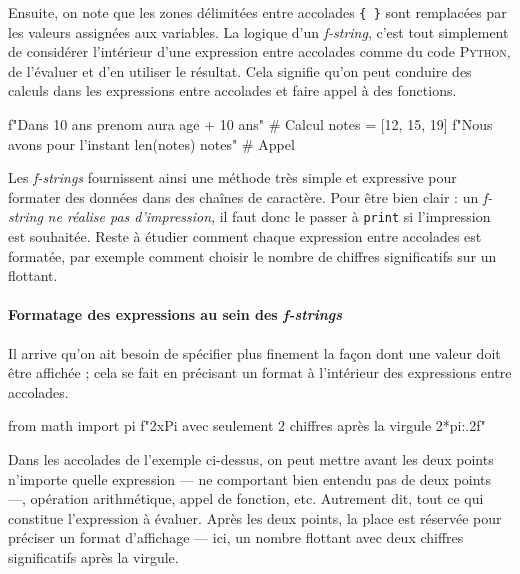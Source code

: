 Ensuite, on note que les zones délimitées entre accolades \texttt{\{ \}} sont remplacées par les valeurs assignées aux variables. La logique d'un \textit{f-string}, c'est tout simplement de considérer l'intérieur d'une expression entre accolades comme du code \textsc{Python}, de l'évaluer et d'en utiliser le résultat. Cela signifie qu'on peut conduire des calculs dans les expressions entre accolades et faire appel à des fonctions.

\begin{idleconsole}
	\begin{pyconsole}
		f"Dans 10 ans {prenom} aura {age + 10} ans" # Calcul
		notes = [12, 15, 19]
		f"Nous avons pour l'instant {len(notes)} notes" # Appel
	\end{pyconsole}
\end{idleconsole}

Les \textit{f-strings} fournissent ainsi une méthode très simple et expressive pour formater des données dans des chaînes de caractère. Pour être bien clair : un \textit{f-string} \emph{ne réalise pas d'impression}, il faut donc le passer à \texttt{print} si l'impression est souhaitée. Reste à étudier comment chaque expression entre accolades est formatée, par exemple comment choisir le nombre de chiffres significatifs sur un flottant.

\paragraph{Formatage des expressions au sein des \textit{f-strings}}
Il arrive qu'on ait besoin de spécifier plus finement la façon dont une valeur doit être affichée ; cela se fait en précisant un format à l'intérieur des expressions entre accolades.

\begin{idleconsole}
	\begin{pyconsole}
		from math import pi
		f"2xPi avec seulement 2 chiffres après la virgule {2*pi:.2f}"
	\end{pyconsole}
\end{idleconsole}

Dans les accolades de l'exemple ci-dessus, on peut mettre avant les deux points n'importe quelle expression --- ne comportant bien entendu pas de deux points ---, opération arithmétique, appel de fonction, etc. Autrement dit, tout ce qui constitue l'expression à évaluer. Après les deux points, la place est réservée pour préciser un format d'affichage --- ici, un nombre flottant avec deux chiffres significatifs après la virgule. 

